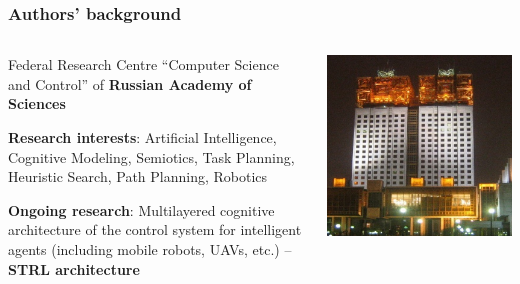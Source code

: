 \documentclass[default]{beamer}
\begin{document}
	\begin{frame}
		\frametitle{Authors' background}
		
		\begin{columns}
			\begin{column}{0.5\textwidth}
				Federal Research Centre ``Computer Science and Control'' of \textbf{Russian Academy of Sciences}
				\par\bigskip
				\textbf{Research interests}: Artificial Intelligence, Cognitive Modeling, Semiotics, Task Planning, Heuristic Search, Path Planning, Robotics
				\par\bigskip
				\textbf{Ongoing research}: Multilayered cognitive architecture of the control system for intelligent agents (including mobile robots, UAVs, etc.) -- \textbf{STRL architecture}
				
			\end{column}
			\begin{column}{0.5\textwidth}
				\centering
				\includegraphics[width=\textwidth]{misc/origin_ras.jpg}
			\end{column}
		\end{columns}
		
	\end{frame}
		
\end{document}
